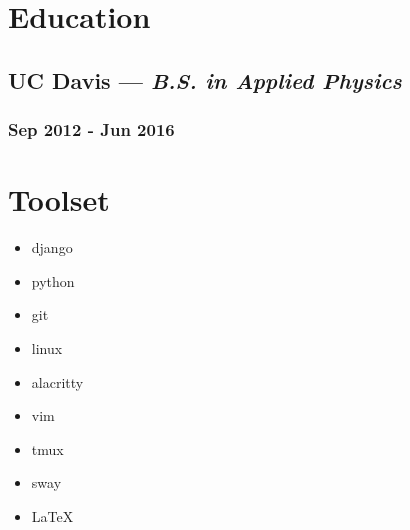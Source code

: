 \documentclass{article}
\begin{document}
\begin{minipage}[t]{.8\textwidth}
\section*{Education}
\subsection*{UC Davis --- \textit{B.S. in Applied Physics}}
\subsubsection*{Sep 2012 - Jun 2016}
\end{minipage}%
\hspace*{0.5cm}
\begin{minipage}[t]{.2\textwidth}
\section*{Toolset}
\vspace{0.8em}
\begin{itemize}
    \item django
    \item python
    \item git
    \item linux
    \item alacritty
    \item vim
    \item tmux
    \item sway
    \item \LaTeX
\end{itemize}
\end{minipage}
\end{document}
